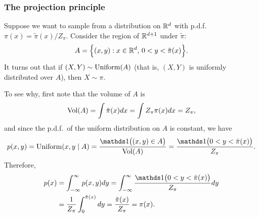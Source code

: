 \documentclass[12pt]{article}
\begin{document}
\subsubsection{The projection principle}

Suppose we want to sample from a distribution on $\mathbb{R}^d$ with p.d.f.\ $\pi(x)=\tilde \pi(x)/Z_\pi$. Consider the region of $\mathbb{R}^{d+1}$ under $\tilde \pi$:
$$ A =\Big\{(x,y): x\in\mathbb{R}^d,\,0<y<\tilde \pi(x)\Big\}. $$
It turns out that if $(X,Y)\sim\operatorname*{Uniform}(A)$ (that is, $(X,Y)$ is uniformly distributed over $A$), then $X\sim \pi$.

To see why, first note that the volume of $A$ is
$$\operatorname*{Vol}(A) = \int \tilde \pi(x) d x = \int Z_\pi \pi(x) d x = Z_\pi, $$
and since the p.d.f.\ of the uniform distribution on $A$ is constant, we have
$$p(x,y) = \Uniform(x,y\mid A) = \frac{\I\big((x,y)\in A\big)}{\Vol(A)} = \frac{\I\big(0<y<\tilde \pi(x)\big)}{Z_\pi}.$$
Therefore,
\begin{align*}
p(x) & =\int_{-\infty}^\infty p(x,y) d y = \int_{-\infty}^\infty \frac{\I\big(0<y<\tilde \pi(x)\big)}{Z_\pi} d y\\
& = \frac{1}{Z_\pi} \int_0^{\tilde \pi(x)} d y = \frac{\tilde \pi(x)}{Z_\pi} = \pi(x).
\end{align*}
\end{document}
